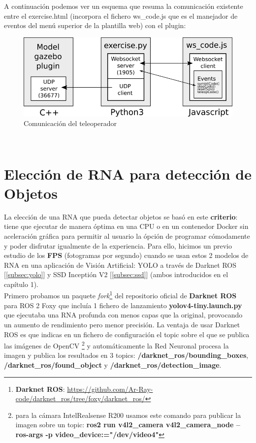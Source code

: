 A continuación podemos ver un esquema que resuma la comunicación existente entre el exercise.html (incorpora el fichero ws\_code.js que es el manejador de eventos del menú superior de la plantilla web) con el plugin:\\

\begin{figure} [H]
  \begin{center}
    \includegraphics[width=15cm]{imagenes/comunicacion-teleoperador.png}
  \end{center}
  \caption[Comunicación del teleoperador]{Comunicación del teleoperador}
  \label{fig:comunicacion_teleoperador}
\end{figure}\

\cleardoublepage




\section{Elección de RNA para detección de Objetos}
\label{sec:eleccion_rna}

La elección de una RNA que pueda detectar objetos se basó en este \textbf{criterio}: tiene que ejecutar de manera óptima en una CPU o en un contenedor Docker sin aceleración gráfica para permitir al usuario la ópción de programar cómodamente y poder disfrutar igualmente de la experiencia. Para ello, hicimos un previo estudio de los \textbf{FPS} (fotogramas por segundo) cuando se usan estos 2 modelos de RNA en una aplicación de Visión Artificial: YOLO a través de Darknet ROS [\ref{subsec:yolo}] y SSD Inceptión V2 [\ref{subsec:ssd}] (ambos introducidos en el capítulo 1).\\

Primero probamos un paquete \textit{fork}\footnote{\textbf{Darknet ROS}: \url{https://github.com/Ar-Ray-code/darknet_ros/tree/foxy/darknet_ros/}} del repositorio oficial de \textbf{Darknet ROS} para ROS 2 Foxy que incluía 1 fichero de lanzamiento \textbf{yolov4-tiny.launch.py} que ejecutaba una RNA profunda con menos capas que la original, provocando un aumento de rendimiento pero menor precisión. La ventaja de usar Darknet ROS es que indicas en un fichero de configuración el topic sobre el que se publica las imágenes de OpenCV \footnote{para la cámara IntelRealsense R200 usamos este comando para publicar la imagen sobre un topic: \textbf{ros2 run v4l2\_camera v4l2\_camera\_node --ros-args -p video\_device:="/dev/video4"}} y automáticamente la Red Neuronal procesa la imagen y publica los resultados en 3 topics: \textbf{/darknet\_ros/bounding\_boxes}, \textbf{/darknet\_ros/found\_object} y \textbf{/darknet\_ros/detection\_image}.\\

